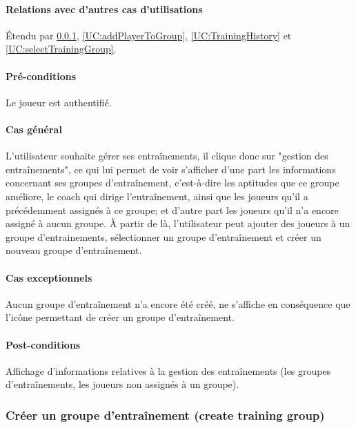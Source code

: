 \paragraph{Relations avec d'autres cas d'utilisations}
Étendu par \ref{UC:createTraining}, \ref{UC:addPlayerToGroup}, \ref{UC:TrainingHistory} et \ref{UC:selectTrainingGroup}.
\paragraph{Pré-conditions}
\begin{list}{}{\leftmargin=1.5em}
\item{Le joueur est authentifié.}
\end{list}
\paragraph{Cas général}
L'utilisateur souhaite gérer ses entraînements, il clique donc sur "gestion des entraînements", ce qui lui permet de voir s'afficher d'une part les informations concernant ses groupes d'entraînement, c'est-à-dire les aptitudes que ce groupe améliore, le coach qui dirige l'entraînement, ainsi que les joueurs qu'il a précédemment assignés à ce groupe; et d'autre part les joueurs qu'il n'a encore assigné à aucun groupe. À partir de là, l'utilisateur peut ajouter des joueurs à un groupe d'entrainements, sélectionner un groupe d'entraînement et créer un nouveau groupe d'entraînement. 
\paragraph{Cas exceptionnels}
Aucun groupe d'entraînement n'a encore été créé, ne s'affiche en conséquence que l'icône permettant de créer un groupe d'entraînement. 
\paragraph{Post-conditions}
\begin{list}{}{\leftmargin=1.5em}
\item{Affichage d'informations relatives à la gestion des entraînements (les groupes d'entraînements, les joueurs non assignés à un groupe).}
\end{list}

\subsubsection{Créer un groupe d'entraînement (create training group)}
\label{UC:createTraining}
